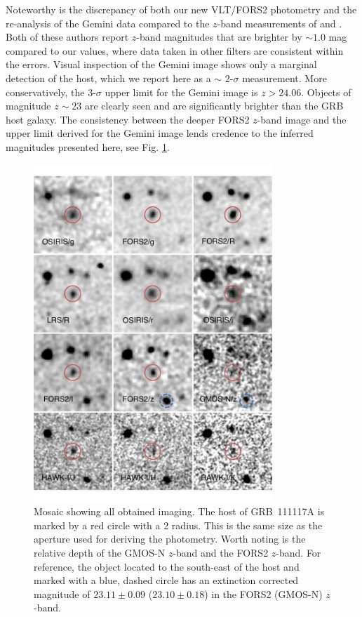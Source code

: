 \documentclass{aa}    %
\begin{document}
Noteworthy is the discrepancy of both our new VLT/FORS2 photometry and the
re-analysis of the Gemini data compared to the $z$-band measurements of
\citet{Margutti2012} and \citet{Sakamoto2013}. Both of these authors report
$z$-band magnitudes that are brighter by $\sim 1.0$ mag compared to our values,
where data taken in other filters are consistent within the errors. Visual
inspection of the Gemini image shows only a marginal detection of the host,
which we report here as a $\sim$ 2-$\sigma$ measurement. More conservatively,
the 3-$\sigma$ upper limit for the Gemini image is $z > 24.06$. Objects of
magnitude $z \sim 23$ are clearly seen and are significantly brighter than the
GRB host galaxy. The consistency between the deeper FORS2 $z$-band image and the
upper limit derived for the Gemini image lends credence to the inferred
magnitudes presented here, see Fig. \ref{fig:photplot}.

\begin{figure}
	\centering
	\includegraphics[width=9cm]{figures/photometry_mosaic.pdf}
	\caption{Mosaic showing all obtained imaging. The host of GRB~111117A is marked by a red circle with a 2 radius. This is the same size as the aperture used for deriving the photometry. Worth noting is the relative depth of the GMOS-N $z$-band and the FORS2 $z$-band. For reference, the object located to the south-east of the host and marked with a blue, dashed circle has an extinction corrected magnitude of $23.11 \pm 0.09$ ($23.10 \pm 0.18$) in the FORS2 (GMOS-N) $z$-band.}
	\label{fig:photplot}
\end{figure}
\end{document}
